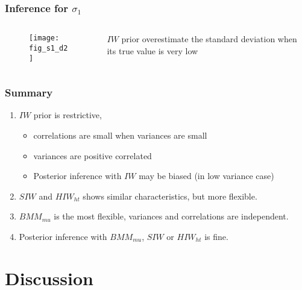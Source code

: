 \documentclass[9pt]{beamer}\usepackage[]{graphicx}\usepackage[]{color}
\begin{document}
\begin{frame}
\frametitle{Inference for $\sigma_1$}
	\begin{columns}
	 \begin{column}{7cm}
\begin{figure}[htbp]
   \texttt{[image: fig\_s1\_d2]} 
\end{figure}
	\end{column}
	\begin{column}{4cm}
$IW$ prior overestimate the standard deviation when its true value is very low
 	\end{column}
	\end{columns}
\end{frame}

\begin{frame}
\frametitle{Summary}
\begin{enumerate} \itemsep2em
\item $IW$ prior is restrictive, 
\begin{itemize}
\item correlations are small when variances are small 
\item variances are positive correlated  
\item Posterior inference with $IW$ may be biased (in low variance case)
\end{itemize}
\item  $SIW$ and $HIW_{ht}$  shows similar characteristics, but more flexible. 
\item $BMM_{mu}$ is the most flexible, variances and correlations are independent.
\item Posterior inference with $BMM_{mu}$, $SIW$ or $HIW_{ht}$ is fine. 
\end{enumerate}
\end{frame}

\section{Discussion}
\end{document}

